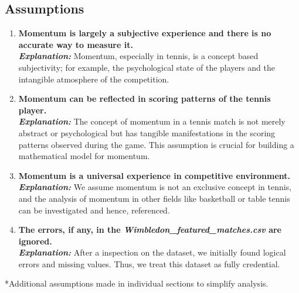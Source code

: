 \documentclass[12pt]{article}  %
\begin{document}
\subsection{Assumptions}
\begin{enumerate}
	\item \textbf{Momentum is largely a subjective experience and there is no accurate way to measure it.}\\
	\textbf{\textit{Explanation: }}Momentum, especially in tennis, is a concept based subjectivity; for example, the psychological state of the players and the intangible atmosphere of the competition.
	\item \textbf{Momentum can be reflected in scoring patterns of the tennis player.}\\
	\textbf{\textit{Explanation: }}The concept of momentum in a tennis match is not merely abstract or psychological but has tangible manifestations in the scoring patterns observed during the game. This assumption is crucial for building a mathematical model for momentum.
	\item \textbf{Momentum is a universal experience in competitive environment.}\\
	\textbf{\textit{Explanation: }}We assume momentum is not an exclusive concept in tennis, and the analysis of momentum in other fields like basketball or table tennis can be investigated and hence, referenced.
	\item \textbf{The errors, if any, in the \textit{Wimbledon\_featured\_matches.csv} are ignored.}\\
	\textbf{\textit{Explanation: }}After a inspection on the dataset, we initially found logical errors and missing values. Thus, we treat this dataset as fully credential. 
\end{enumerate}
*Additional assumptions made in individual sections to simplify analysis. 


\end{document}
